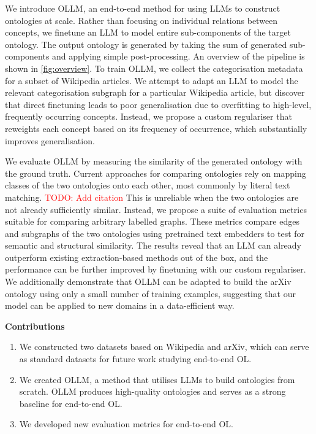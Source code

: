 \documentclass{article}
\newcommand{\todo}[1]{\textcolor{red}{TODO: #1}}
\newcommand{\name}{{OLLM}\xspace}
\begin{document}


We introduce \name, an end-to-end method for using LLMs to construct ontologies at scale. Rather than focusing on individual relations between concepts, we finetune an LLM to model entire sub-components of the target ontology. The output ontology is generated by taking the sum of generated sub-components and applying simple post-processing. An overview of the pipeline is shown in \cref{fig:overview}. To train \name, we collect the categorisation metadata for a subset of Wikipedia articles. We attempt to adapt an LLM to model the relevant categorisation subgraph for a particular Wikipedia article, but discover that direct finetuning leads to poor generalisation due to overfitting to high-level, frequently occurring concepts. Instead, we propose a custom regulariser that reweights each concept based on its frequency of occurrence, which substantially improves generalisation. 

We evaluate \name by measuring the similarity of the generated ontology with the ground truth. Current approaches for comparing ontologies rely on mapping classes of the two ontologies onto each other, most commonly by literal text matching. \todo{Add citation} This is unreliable when the two ontologies are not already sufficiently similar. Instead, we propose a suite of evaluation metrics suitable for comparing arbitrary labelled graphs. These metrics compare edges and subgraphs of the two ontologies using pretrained text embedders to test for semantic and structural similarity. The results reveal that an LLM can already outperform existing extraction-based methods out of the box, and the performance can be further improved by finetuning with our custom regulariser. We additionally demonstrate that \name can be adapted to build the arXiv ontology using only a small number of training examples, suggesting that our model can be applied to new domains in a data-efficient way. 

\textbf{Contributions}
\begin{enumerate}
    \item We constructed two datasets based on Wikipedia and arXiv, which can serve as standard datasets for future work studying end-to-end OL.
    \item We created \name, a method that utilises LLMs to build ontologies from scratch. \name produces high-quality ontologies and serves as a strong baseline for end-to-end OL.
    \item We developed new evaluation metrics for end-to-end OL. 
\end{enumerate}
\end{document}
